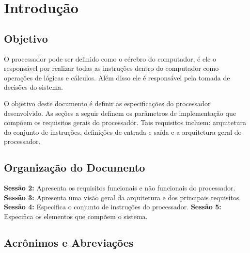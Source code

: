 \documentclass{report}
\begin{document}
\section{Introdução}
\subsection{Objetivo} 
O processador pode ser definido como o cérebro do computador, é ele o responsável por realizar todas as instruções dentro do computador como operações de lógicas e cálculos. Além disso ele é responsável pela tomada de decisões do sistema.

O objetivo deste documento é definir as especificações do processador desenvolvido. As seções a seguir definem os parâmetros de implementação que compõem os requisitos gerais do processador. Tais requisitos incluem: arquitetura do conjunto de instruções, definições de entrada e saída e a arquitetura geral do processador. 

\subsection{Organização do Documento} 
\textbf{Sessão 2:} Apresenta os requisitos funcionais e não funcionais do processador. \newline
\textbf{Sessão 3:} Apresenta uma visão geral da arquitetura e dos principais requisitos. \newline
\textbf{Sessão 4:} Especifica o conjunto de instruções do processador. \newline
\textbf{Sessão 5:} Especifica os elementos que compõem o sistema.\newline

\subsection{Acrônimos e Abreviações}
\end{document}
